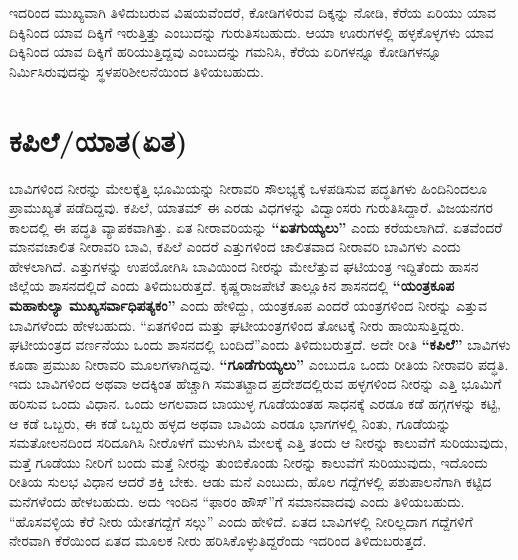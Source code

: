 ಇದರಿಂದ ಮುಖ್ಯವಾಗಿ ತಿಳಿದುಬರುವ ವಿಷಯವೆಂದರೆ, ಕೋಡಿಗಳಿರುವ ದಿಕ್ಕನ್ನು ನೋಡಿ, ಕೆರೆಯ ಏರಿಯು ಯಾವ ದಿಕ್ಕಿನಿಂದ ಯಾವ ದಿಕ್ಕಿಗೆ ಇರುತ್ತಿತ್ತು ಎಂಬುದನ್ನು ಗುರುತಿಸಬಹುದು. ಆಯಾ ಊರುಗಳಲ್ಲಿ ಹಳ್ಳಕೊಳ್ಳಗಳು ಯಾವ ದಿಕ್ಕಿನಿಂದ ಯಾವ ದಿಕ್ಕಿಗೆ ಹರಿಯುತ್ತಿದ್ದವು ಎಂಬುದನ್ನು ಗಮನಿಸಿ, ಕೆರೆಯ ಏರಿಗಳನ್ನೂ ಕೋಡಿಗಳನ್ನೂ ನಿರ್ಮಿಸಿರುವುದನ್ನು ಸ್ಥಳಪರಿಶೀಲನೆಯಿಂದ ತಿಳಿಯಬಹುದು.


\section{ಕಪಿಲೆ/ಯಾತ(ಏತ)}

ಬಾವಿಗಳಿಂದ ನೀರನ್ನು ಮೇಲಕ್ಕೆತ್ತಿ ಭೂಮಿಯನ್ನು ನೀರಾವರಿ ಸೌಲಭ್ಯಕ್ಕೆ ಒಳಪಡಿಸುವ ಪದ್ಧತಿಗಳು ಹಿಂದಿನಿಂದಲೂ ಪ್ರಾಮುಖ್ಯತೆ ಪಡೆದಿದ್ದವು. ಕಪಿಲೆ, ಯಾತಮ್ ಈ ಎರಡು ವಿಧಗಳನ್ನು ವಿದ್ವಾಂಸರು ಗುರುತಿಸಿದ್ದಾರೆ. ವಿಜಯನಗರ ಕಾಲದಲ್ಲಿ ಈ ಪದ್ಧತಿ ವ್ಯಾಪಕವಾಗಿತ್ತು. ಏತ ನೀರಾವರಿಯನ್ನು \textbf{“ಏತಗುಯ್ಯಲು”} ಎಂದು ಕರೆಯಲಾಗಿದೆ. ಏತವೆಂದರೆ ಮಾನವಚಾಲಿತ ನೀರಾವರಿ ಬಾವಿ, ಕಪಿಲೆ ಎಂದರೆ ಎತ್ತುಗಳಿಂದ ಚಾಲಿತವಾದ ನೀರಾವರಿ ಬಾವಿಗಳು ಎಂದು ಹೇಳಲಾಗಿದೆ. ಎತ್ತುಗಳನ್ನು ಉಪಯೋಗಿಸಿ ಬಾವಿಯಿಂದ ನೀರನ್ನು ಮೇಲೆತ್ತುವ ಘಟಿಯಂತ್ರ ಇದ್ದಿತೆಂದು ಹಾಸನ ಜಿಲ್ಲೆಯ ಶಾಸನದಲ್ಲಿದೆ ಎಂದು ತಿಳಿದುಬರುತ್ತದೆ. ಕೃಷ್ಣರಾಜಪೇಟೆ ತಾಲ್ಲೂಕಿನ ಶಾಸನದಲ್ಲಿ \textbf{“ಯಂತ್ರಕೂಪ ಮಹಾಕುಲ್ಯಾ ಮುಖ್ಯಸರ್ವಾಧಿಪತ್ಯಕಂ”} ಎಂದು ಹೇಳಿದ್ದು, ಯಂತ್ರಕೂಪ ಎಂದರೆ ಯಂತ್ರಗಳಿಂದ ನೀರನ್ನು ಎತ್ತುವ ಬಾವಿಗಳೆಂದು ಹೇಳಬಹುದು. “ಏತಗಳಿಂದ ಮತ್ತು ಘಟೀಯಂತ್ರಗಳಿಂದ ತೋಟಕ್ಕೆ ನೀರು ಹಾಯಿಸುತ್ತಿದ್ದರು. ಘಟೀಯಂತ್ರದ ವರ್ಣನೆಯು ಒಂದು ಶಾಸನದಲ್ಲಿ ಬಂದಿದೆ”ಎಂದು ತಿಳಿದುಬರುತ್ತದೆ. ಅದೇ ರೀತಿ \textbf{“ಕಪಿಲೆ” }ಬಾವಿಗಳು ಕೂಡಾ ಪ್ರಮುಖ ನೀರಾವರಿ ಮೂಲಗಳಾಗಿದ್ದವು. \textbf{“ಗೂಡೆಗುಯ್ಯಲು”} ಎಂಬುದೂ ಒಂದು ರೀತಿಯ ನೀರಾವರಿ ಪದ್ಧತಿ. ಇದು ಬಾವಿಗಳಿಂದ ಅಥವಾ ಅದಕ್ಕಿಂತ ಹೆಚ್ಚಾಗಿ ಸಮತಟ್ಟಾದ ಪ್ರದೇಶದಲ್ಲಿರುವ ಹಳ್ಳಗಳಿಂದ ನೀರನ್ನು ಎತ್ತಿ ಭೂಮಿಗೆ ಹರಿಸುವ ಒಂದು ವಿಧಾನ. ಒಂದು ಅಗಲವಾದ ಬಾಯುಳ್ಳ ಗೂಡೆಯಂತಹ ಸಾಧನಕ್ಕೆ ಎರಡೂ ಕಡೆ ಹಗ್ಗಗಳನ್ನು ಕಟ್ಟಿ, ಆ ಕಡೆ ಒಬ್ಬರು, ಈ ಕಡೆ ಒಬ್ಬರು ಹಳ್ಳದ ಅಥವಾ ಬಾವಿಯ ಎರಡೂ ಭಾಗಗಳಲ್ಲಿ ನಿಂತು, ಗೂಡೆಯನ್ನು ಸಮತೋಲನದಿಂದ ಸರಿದೂಗಿಸಿ ನೀರೊಳಗೆ ಮುಳುಗಿಸಿ ಮೇಲಕ್ಕೆ ಎತ್ತಿ ತಂದು ಆ ನೀರನ್ನು ಕಾಲುವೆಗೆ ಸುರಿಯುವುದು, ಮತ್ತೆ ಗೂಡೆಯು ನೀರಿಗೆ ಬಂದು ಮತ್ತೆ ನೀರನ್ನು ತುಂಬಿಕೊಂಡು ನೀರನ್ನು ಕಾಲುವೆಗೆ ಸುರಿಯುವುದು, ಇದೊಂದು ರೀತಿಯ ಸುಲಭ ವಿಧಾನ ಆದರೆ ಶಕ್ತಿ ಬೇಕು. ಆಡು ಮನೆ ಎಂಬುದು, ಹೊಲ ಗದ್ದೆಗಳಲ್ಲಿ ಪಶುಪಾಲನೆಗಾಗಿ ಕಟ್ಟಿದ ಮನೆಗಳೆಂದು ಹೇಳಬಹುದು. ಅದು ಇಂದಿನ “ಫಾರಂ ಹೌಸ್​”ಗೆ ಸಮಾನವಾದವು ಎಂದು ತಿಳಿಯಬಹುದು. “ಹೊಸವಳ್ಳಿಯ ಕೆರೆ ನೀರು ಯೇತಗದ್ದೆಗೆ ಸಲ್ಗು” ಎಂದು ಹೇಳಿದೆ. ಏತದ ಬಾವಿಗಳಲ್ಲಿ ನೀರಿಲ್ಲದಾಗ ಗದ್ದೆಗಳಿಗೆ ನೇರವಾಗಿ ಕೆರೆಯಿಂದ ಏತದ ಮೂಲಕ ನೀರು ಹರಿಸಿಕೊಳ್ಳುತಿದ್ದರೆಂದು ಇದರಿಂದ ತಿಳಿದುಬರುತ್ತದೆ.


